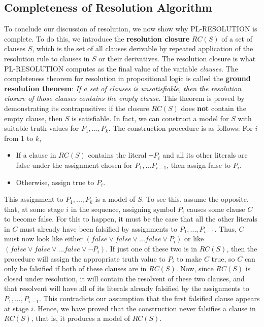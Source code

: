 \subsection{Completeness of Resolution Algorithm}
To conclude our discussion of resolution, we now show why PL-RESOLUTION is complete. To do this, we introduce the \textbf{resolution closure} $RC(S)$ of a set of clauses $S$, which is the set of all clauses derivable by repeated application of the resolution rule to clauses in $S$ or their
derivatives. The resolution closure is what PL-RESOLUTION computes as the final value of the variable \textit{clauses}.\newline\newline
The completeness theorem for resolution in propositional logic is called the \textbf{ground resolution theorem}: \textit{If a set of clauses is unsatisfiable, then the resolution closure of those clauses contains the empty clause}.
\newline\newline
This theorem is proved by demonstrating its contrapositive: if the closure $RC(S)$ does \textbf{not} contain the empty clause, then $S$ is satisfiable. In fact, we can construct a model for $S$ with suitable truth values for $P_1, ..., P_k$. The construction procedure is as follows:\newline\newline
For $i$ from 1 to $k$,
\begin{itemize}
    \item If a clause in $RC(S)$ contains the literal $\neg{P_i}$ and all its other literals are false under the assignment chosen for $P_1, ... P_{i-1}$, then assign false to $P_i$.

    \item Otherwise, assign true to $P_i$.
\end{itemize}
This assignment to $P_1,...,P_k$ is a model of $S$. To see this, assume the opposite, that, at some stage $i$ in the sequence, assigning symbol $P_i$ causes some clause $C$ to become false. For this to happen, it must be the case that all the other literals in $C$ must already have been falsified by assignments to $P_1,...,P_{i-1}$. Thus, $C$ must now look like either $(false \lor false \lor ... false \lor P_i)$ or like $(false \lor false \lor ... false \lor \neg{P_i})$.  If just one of these two is in $RC(S)$, then the procedure will assign the appropriate truth value to $P_i$ to make $C$ true, so $C$ can only be falsified if both of these clauses are in $RC(S)$.  Now, since $RC(S)$ is closed under resolution, it will contain the resolvent of these two clauses, and that resolvent will have all of its literals already falsified by the assignments to $P_1,...,P_{i-1}$. This contradicts our assumption that the first falsified clause appears at stage $i$. Hence, we have proved that the construction never falsifies a clause in $RC(S)$,  that is, it produces a model of $RC(S)$. 
